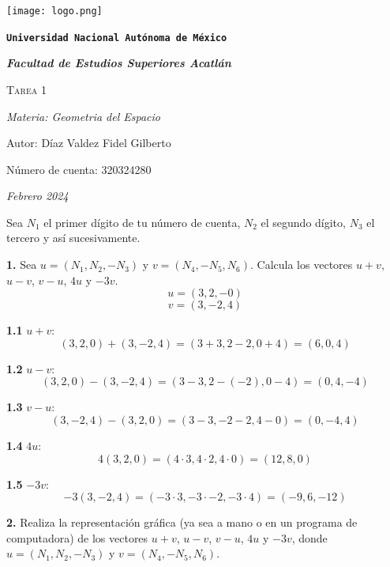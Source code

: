 \documentclass{article}
\begin{document}
\begin{titlepage}
    \centering
    {\texttt{[image: logo.png]}\par}
    {\texttt{\bfseries \LARGE Universidad Nacional Autónoma de México} \par}
    \vspace{1cm}
    {\itshape \Large \bfseries Facultad de Estudios Superiores Acatlán \par}
    \vspace{3cm}
    {\scshape \Huge Tarea 1 \par}
    \vspace {3cm}
    {\slshape \Large Materia: Geometria del Espacio \par}
    \vspace{2cm}
    {\Large Autor: Díaz Valdez Fidel Gilberto\par}
    {\Large Número de cuenta: 320324280\par}
    \vfill
    {\itshape Febrero 2024 \par}
\end{titlepage}

Sea $N_1$ el primer dígito de tu número de cuenta, $N_2$ el segundo dígito, $N_3$ el tercero y así 
sucesivamente.
\par  %
\textbf{1.} Sea $u= (N_1, N_2, -N_3)$ y $v= (N_4, -N_5, N_6)$. Calcula los vectores $u+v$, $u-v$, $v-u$, $4u$ y 
$-3v$.
$$u = (3, 2, -0)$$ $$v = (3, -2, 4)$$

\textbf{1.1} $u+v$: 
$$(3, 2, 0) + (3, -2, 4) = (3+3, 2-2, 0+4) = (6, 0, 4)$$  

\textbf{1.2} $u-v$: 
$$(3, 2, 0) - (3, -2, 4) = (3-3, 2-(-2), 0-4) = (0, 4, -4)$$

\textbf{1.3} $v-u$: 
$$ (3, -2, 4) - (3, 2, 0)= (3-3, -2-2, 4-0) = (0, -4, 4)$$

\textbf{1.4} $4u$: 
$$4(3, 2, 0)= (4\cdot3, 4\cdot2, 4\cdot0) = (12, 8, 0)$$

\textbf{1.5} $-3v$: 
$$-3(3, -2, 4) = (-3\cdot3, -3\cdot-2, -3\cdot4) = (-9, 6, -12)$$

\newpage
\textbf{2.} Realiza la representación gráfica (ya sea a mano o en un programa de computadora) 
de los vectores $u+v$, $u-v$, $v-u$, $4u$ y $-3v$, donde $u= (N_1, N_2, -N_3)$ y $v= (N_4, -N_5, N_6)$.
\end{document}
